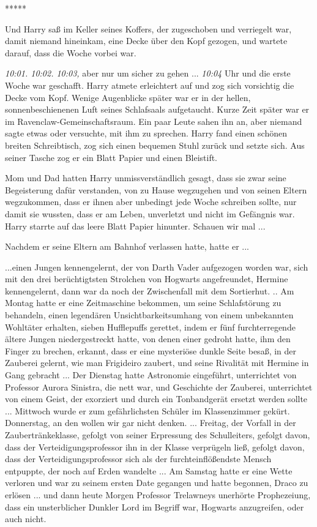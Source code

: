 \begin{center}*****\end{center}

Und Harry saß im Keller seines Koffers, der zugeschoben und verriegelt war,
damit niemand hineinkam, eine Decke über den Kopf gezogen, und wartete darauf,
dass die Woche vorbei war.

\emph{10:01. 10:02. 10:03,} aber nur um sicher zu gehen ... \emph{10:04} Uhr und
die erste Woche war geschafft. Harry atmete erleichtert auf und zog sich
vorsichtig die Decke vom Kopf. Wenige Augenblicke später war er in der hellen,
sonnenbeschienenen Luft seines Schlafsaals aufgetaucht. Kurze Zeit später war er
im Ravenclaw-Gemeinschaftsraum. Ein paar Leute sahen ihn an, aber niemand sagte
etwas oder versuchte, mit ihm zu sprechen. Harry fand einen schönen breiten
Schreibtisch, zog sich einen bequemen Stuhl zurück und setzte sich. Aus seiner
Tasche zog er ein Blatt Papier und einen Bleistift.

Mom und Dad hatten Harry unmissverständlich gesagt, dass sie zwar seine
Begeisterung dafür verstanden, von zu Hause wegzugehen und von seinen Eltern
wegzukommen, dass er ihnen aber unbedingt jede Woche schreiben sollte, nur damit
sie wussten, dass er am Leben, unverletzt und nicht im Gefängnis war. Harry
starrte auf das leere Blatt Papier hinunter. Schauen wir mal ...

Nachdem er seine Eltern am Bahnhof verlassen hatte, hatte er ...

...einen Jungen kennengelernt, der von Darth Vader aufgezogen worden war, sich
mit den drei berüchtigtsten Strolchen von Hogwarts angefreundet, Hermine
kennengelernt, dann war da noch der Zwischenfall mit dem Sortierhut. .. Am
Montag hatte er eine Zeitmaschine bekommen, um seine Schlafstörung zu behandeln,
einen legendären Unsichtbarkeitsumhang von einem unbekannten Wohltäter erhalten,
sieben Hufflepuffs gerettet, indem er fünf furchterregende ältere Jungen
niedergestreckt hatte, von denen einer gedroht hatte, ihm den Finger zu brechen,
erkannt, dass er eine mysteriöse dunkle Seite besaß, in der Zauberei gelernt,
wie man Frigideiro zaubert, und seine Rivalität mit Hermine in Gang gebracht ...
Der Dienstag hatte Astronomie eingeführt, unterrichtet von Professor Aurora
Sinistra, die nett war, und Geschichte der Zauberei, unterrichtet von einem
Geist, der exorziert und durch ein Tonbandgerät ersetzt werden sollte ...
Mittwoch wurde er zum gefährlichsten Schüler im Klassenzimmer gekürt.
Donnerstag, an den wollen wir gar nicht denken. ... Freitag, der Vorfall in der
Zaubertränkeklasse, gefolgt von seiner Erpressung des Schulleiters, gefolgt
davon, dass der Verteidigungsprofessor ihn in der Klasse verprügeln ließ,
gefolgt davon, dass der Verteidigungsprofessor sich als der furchteinflößendste
Mensch entpuppte, der noch auf Erden wandelte ... Am Samstag hatte er eine Wette
verloren und war zu seinem ersten Date gegangen und hatte begonnen, Draco zu
erlösen ... und dann heute Morgen Professor Trelawneys unerhörte Prophezeiung,
dass ein unsterblicher Dunkler Lord im Begriff war, Hogwarts anzugreifen, oder
auch nicht.

